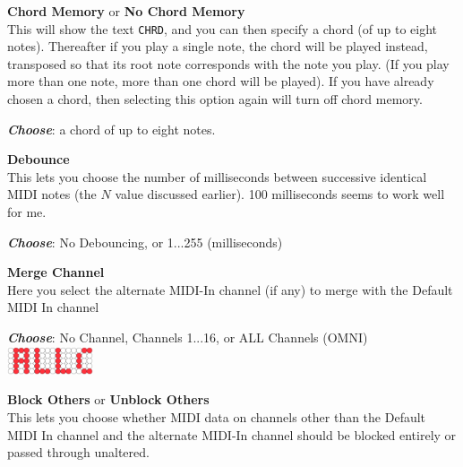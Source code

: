 \documentclass{article}
\begin{document}
\begin{description}
	\item{\bf Chord Memory} or {\bf No Chord Memory}\\
		This will show the text \texttt{CHRD}, and you can then specify a chord (of up to eight notes).  Thereafter if you play a single note, the chord will be played instead, transposed so that its root note corresponds with the note you play. (If you play more than one note, more than one chord will be played).  If you have already chosen a chord, then selecting this option again will turn off chord memory.
				
		\begin{description}
		\item{\bf \textit{Choose}}: a chord of up to eight notes.
		\end{description}
		
	\item{\bf Debounce}\\
		This lets you choose the number of milliseconds between successive identical MIDI notes (the \(N\) value discussed earlier).  100 milliseconds seems to work well for me.
		\begin{description}
		\item{\bf \textit{Choose}}: No Debouncing, or 1...255 (milliseconds)\\\rule[0em]{0em}{0em}\hspace{\fill} 
		\end{description}

	\item{\bf Merge Channel}\\
		Here you select the alternate MIDI-In channel (if any) to merge with the Default MIDI In channel
		\begin{description}
		\item{\bf \textit{Choose}}: No Channel, Channels 1...16, or ALL Channels (OMNI)~{\includegraphics[width=1in]{all.pdf}}
		\end{description}


	\item{\bf Block Others} or {\bf Unblock Others}\\
		This lets you choose whether MIDI data on channels other than the Default MIDI In channel and the alternate MIDI-In channel should be blocked entirely or passed through unaltered.
				
	\end{description}
\end{document}
